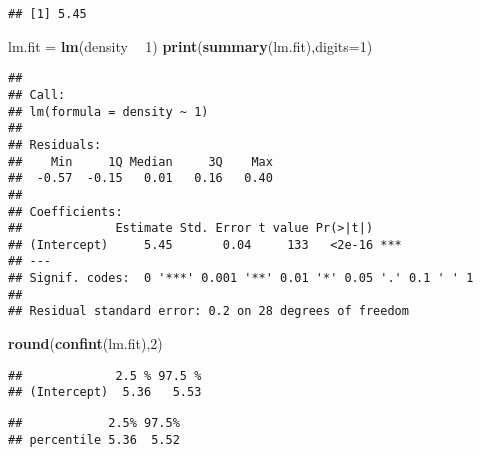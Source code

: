 \documentclass[]{book}
\newenvironment{Shaded}{\begin{snugshade}}{\end{snugshade}}
\newcommand{\DataTypeTok}[1]{\textcolor[rgb]{0.13,0.29,0.53}{#1}}
\newcommand{\DecValTok}[1]{\textcolor[rgb]{0.00,0.00,0.81}{#1}}
\newcommand{\KeywordTok}[1]{\textcolor[rgb]{0.13,0.29,0.53}{\textbf{#1}}}
\newcommand{\NormalTok}[1]{#1}
\newcommand{\OperatorTok}[1]{\textcolor[rgb]{0.81,0.36,0.00}{\textbf{#1}}}
\newcommand{\StringTok}[1]{\textcolor[rgb]{0.31,0.60,0.02}{#1}}
\begin{document}
\begin{verbatim}
## [1] 5.45
\end{verbatim}

\begin{Shaded}
\begin{Highlighting}[]
\NormalTok{lm.fit =}\StringTok{  }\KeywordTok{lm}\NormalTok{(density }\OperatorTok{~}\StringTok{ }\DecValTok{1}\NormalTok{)}
\KeywordTok{print}\NormalTok{(}\KeywordTok{summary}\NormalTok{(lm.fit),}\DataTypeTok{digits=}\DecValTok{1}\NormalTok{)}
\end{Highlighting}
\end{Shaded}

\begin{verbatim}
## 
## Call:
## lm(formula = density ~ 1)
## 
## Residuals:
##    Min     1Q Median     3Q    Max 
##  -0.57  -0.15   0.01   0.16   0.40 
## 
## Coefficients:
##             Estimate Std. Error t value Pr(>|t|)    
## (Intercept)     5.45       0.04     133   <2e-16 ***
## ---
## Signif. codes:  0 '***' 0.001 '**' 0.01 '*' 0.05 '.' 0.1 ' ' 1
## 
## Residual standard error: 0.2 on 28 degrees of freedom
\end{verbatim}

\begin{Shaded}
\begin{Highlighting}[]
\KeywordTok{round}\NormalTok{(}\KeywordTok{confint}\NormalTok{(lm.fit),}\DecValTok{2}\NormalTok{)}
\end{Highlighting}
\end{Shaded}

\begin{verbatim}
##             2.5 % 97.5 %
## (Intercept)  5.36   5.53
\end{verbatim}

\begin{Shaded}
\end{Shaded}

\begin{verbatim}
##            2.5% 97.5%
## percentile 5.36  5.52
\end{verbatim}
\end{document}
